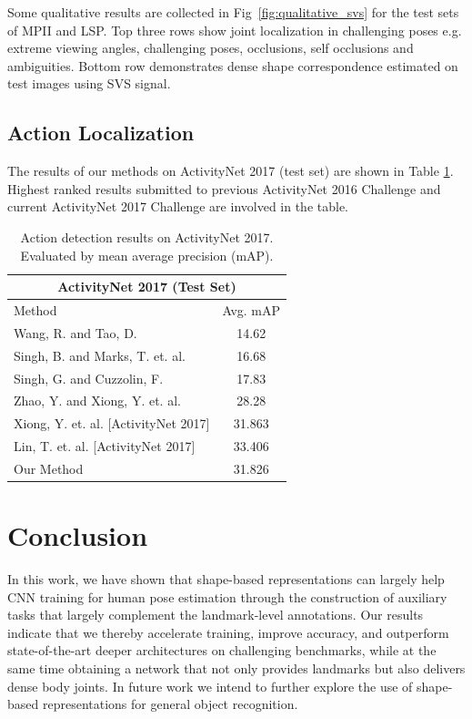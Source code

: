 Some qualitative results are collected in Fig~\ref{fig:qualitative_svs} for the test sets of MPII and LSP. Top three rows show joint localization in challenging poses e.g. extreme viewing angles, challenging poses, occlusions, self occlusions and ambiguities. Bottom row demonstrates dense shape correspondence estimated on test images using SVS signal.

\subsection{Action Localization}

The results of our methods on ActivityNet 2017 (test set) are shown in Table \ref{table:experiment}. Highest ranked results submitted to previous ActivityNet 2016 Challenge and current ActivityNet 2017 Challenge are involved in the table.

\begin{table}[!htp]
  \centering
  \begin{tabular}{|l|c|}
  \hline
  \multicolumn{2}{|c|}{ActivityNet 2017 (Test Set)} \\
  \hline
  Method & Avg. mAP \\
  \hline
  Wang, R. and Tao, D.~\cite{uts2016activitynet} & 14.62 \\
  Singh, B. and Marks, T. et. al.~\cite{singh2016multi} & 16.68 \\
  Singh, G. and Cuzzolin, F.~\cite{singh2016untrimmed} & 17.83 \\
  Zhao, Y. and Xiong, Y. et. al.~\cite{zhao2017temporal} & 28.28 \\
  \hline
  Xiong, Y. et. al. [ActivityNet 2017] & 31.863 \\
  Lin, T. et. al. [ActivityNet 2017] & 33.406 \\
  \hline
  Our Method & 31.826 \\
  \hline
  \end{tabular}%
  \caption{Action detection results on ActivityNet 2017. Evaluated by mean average precision (mAP).}\label{table:experiment}
\end{table}

\label{sec:pred_mpii_lsp}

\section{Conclusion}
In this work, we have shown that shape-based representations can largely help CNN training for human pose estimation through the construction of auxiliary tasks that largely complement the landmark-level annotations. Our results indicate that we thereby accelerate training, improve accuracy, and outperform state-of-the-art deeper architectures on challenging benchmarks, while at the same time obtaining a network that not only provides landmarks but also delivers dense body joints. In future work we intend to further explore the use of shape-based representations for general object recognition. 

